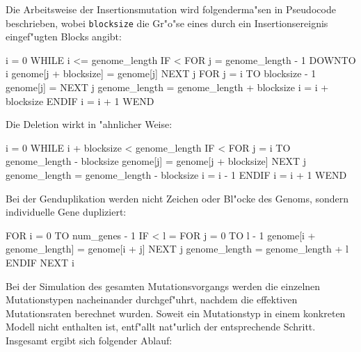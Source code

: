 Die Arbeitsweise der Insertionsmutation wird folgenderma"sen in Pseudocode beschrieben,
wobei \verb|blocksize| die Gr"o"se eines durch ein Insertionsereignis eingef"ugten
Blocks angibt:

\begin{verbatimcmd}
i = 0
WHILE i <= genome_length
  IF  < 
    FOR j = genome_length - 1 DOWNTO i
      genome[j + blocksize] = genome[j]
    NEXT j
    FOR j = i TO blocksize - 1
      genome[j] = 
    NEXT j
    genome_length = genome_length + blocksize
    i = i + blocksize
  ENDIF
  i = i + 1
WEND
\end{verbatimcmd}

Die Deletion wirkt in "ahnlicher Weise:

\begin{verbatimcmd}
i = 0
WHILE i + blocksize < genome_length
  IF  < 
    FOR j = i TO genome_length - blocksize
      genome[j] = genome[j + blocksize]
    NEXT j
    genome_length = genome_length - blocksize
    i = i - 1
  ENDIF
  i = i + 1
WEND
\end{verbatimcmd}

Bei der Genduplikation werden nicht Zeichen oder Bl"ocke des Genoms,
sondern individuelle Gene dupliziert:

\begin{verbatimcmd}
FOR i = 0 TO num_genes - 1
  IF  < 
    l = 
    FOR j = 0 TO l - 1
      genome[i + genome_length] = genome[i + j]
    NEXT j
    genome_length = genome_length + l
  ENDIF
NEXT i
\end{verbatimcmd}

Bei der Simulation des gesamten Mutationsvorgangs werden die einzelnen
Mutationstypen nacheinander durchgef"uhrt, nachdem die effektiven Mutationsraten
berechnet wurden.
Soweit ein Mutationstyp in einem konkreten Modell nicht enthalten ist,
entf"allt nat"urlich der entsprechende Schritt. Insgesamt ergibt sich folgender
Ablauf:

\begin{verbatimcmd}
\end{verbatimcmd}

